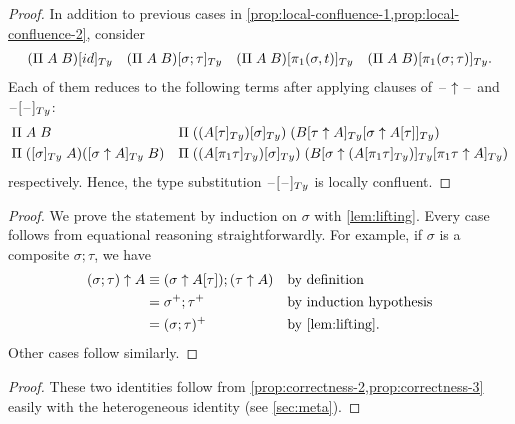 \documentclass[a4paper,UKenglish,numberwithinsect,cleveref,thm-restate]{lipics-v2021}
\begin{document}
\propConfluenceThree*
\begin{proof}
  In addition to previous cases in \cref{prop:local-confluence-1,prop:local-confluence-2}, consider
  \begin{align*}
    \subTy{(\Pi\;A\;B)}{\idS} && \subTy{(\Pi\;A\;B)}{\sigma;\tau} && \subTy{(\Pi\;A\;B)}{\pi_1(\sigma, t)} && \subTy{(\Pi\;A\;B)}{\pi_1(\sigma; \tau)}.
  \end{align*}
  Each of them reduces to the following terms after applying clauses of $\mathord{\hspace{1pt}\text{--}\hspace{1pt}}\uparrow\mathord{\hspace{1pt}\text{--}\hspace{1pt}}$ and $\subTy{\blank}{\blank}$:
  \begin{align*}
    & \Pi\;A\;B                && \Pi\;(\subTy{(\subTy{A}{\tau})}{\sigma})\;(\subTy{\subTy{B}{\tau \uparrow A}}{\sigma \uparrow \sub{A}{\tau}}) \\
    & \Pi\;([\sigma]_{\Ty}\;A)([\sigma \uparrow A]_{\Ty}\;B) && \Pi\;(\subTy{(\subTy{A}{\pi_1\tau})}{\sigma})\;(\subTy{\subTy{B}{\sigma \uparrow (\subTy{A}{\pi_1\tau})}}{\pi_1 \tau \uparrow A})
  \end{align*}
  respectively.
  Hence, the type substitution $\subTy{\blank}{\blank}$ is locally confluent.
\end{proof}

\propCorrectnessTwo*
\begin{proof}
  We prove the statement by induction on $\sigma$ with \cref{lem:lifting}.
  Every case follows from equational reasoning straightforwardly.
  For example, if $\sigma$ is a composite $\sigma;\tau$, we have
  \begin{align*}
    (\sigma;\tau) \uparrow A & \judgeq (\sigma \uparrow \sub{A}{\tau});(\tau \uparrow A) && \text{by definition} \\
                             & = \sigma^+;\tau^+                                     && \text{by induction hypothesis} \\ 
                             & = (\sigma;\tau)^+                                     && \text{by \cref{lem:lifting}.} 
  \end{align*}
  Other cases follow similarly.
\end{proof}

\propCoherenceUparrow*
\begin{proof}
  These two identities follow from \cref{prop:correctness-2,prop:correctness-3} easily with the heterogeneous identity (see \cref{sec:meta}).
\end{proof}
\end{document}
